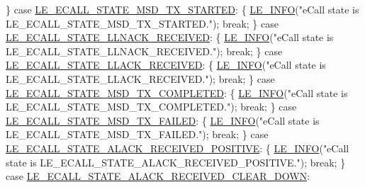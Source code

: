 \begin{DoxyCodeInclude}
{{{{{        \}
        \textcolor{keywordflow}{case} \hyperlink{le__ecall__interface_8h_a233609e4724e549a1405f9177c0a07dda0e8c495854c6fe3f9fe9285554704572}{LE\_ECALL\_STATE\_MSD\_TX\_STARTED}:
        \{
            \hyperlink{le__log_8h_a23e6d206faa64f612045d688cdde5808}{LE\_INFO}(\textcolor{stringliteral}{"eCall state is LE\_ECALL\_STATE\_MSD\_TX\_STARTED."});
            \textcolor{keywordflow}{break};
        \}
        \textcolor{keywordflow}{case} \hyperlink{le__ecall__interface_8h_a233609e4724e549a1405f9177c0a07dda8699c87772e74835e38573fc9830dba5}{LE\_ECALL\_STATE\_LLNACK\_RECEIVED}:
        \{
            \hyperlink{le__log_8h_a23e6d206faa64f612045d688cdde5808}{LE\_INFO}(\textcolor{stringliteral}{"eCall state is LE\_ECALL\_STATE\_LLNACK\_RECEIVED."});
            \textcolor{keywordflow}{break};
        \}
        \textcolor{keywordflow}{case} \hyperlink{le__ecall__interface_8h_a233609e4724e549a1405f9177c0a07dda0410bf309197a2f26910062efb56ed0e}{LE\_ECALL\_STATE\_LLACK\_RECEIVED}:
        \{
            \hyperlink{le__log_8h_a23e6d206faa64f612045d688cdde5808}{LE\_INFO}(\textcolor{stringliteral}{"eCall state is LE\_ECALL\_STATE\_LLACK\_RECEIVED."});
            \textcolor{keywordflow}{break};
        \}
        \textcolor{keywordflow}{case} \hyperlink{le__ecall__interface_8h_a233609e4724e549a1405f9177c0a07ddae9346b115da82c9583f057ba12d8faa9}{LE\_ECALL\_STATE\_MSD\_TX\_COMPLETED}:
        \{
            \hyperlink{le__log_8h_a23e6d206faa64f612045d688cdde5808}{LE\_INFO}(\textcolor{stringliteral}{"eCall state is LE\_ECALL\_STATE\_MSD\_TX\_COMPLETED."});
            \textcolor{keywordflow}{break};
        \}
        \textcolor{keywordflow}{case} \hyperlink{le__ecall__interface_8h_a233609e4724e549a1405f9177c0a07dda3654bda55c075297e9111acafa90a2bb}{LE\_ECALL\_STATE\_MSD\_TX\_FAILED}:
        \{
            \hyperlink{le__log_8h_a23e6d206faa64f612045d688cdde5808}{LE\_INFO}(\textcolor{stringliteral}{"eCall state is LE\_ECALL\_STATE\_MSD\_TX\_FAILED."});
            \textcolor{keywordflow}{break};
        \}
        \textcolor{keywordflow}{case} \hyperlink{le__ecall__interface_8h_a233609e4724e549a1405f9177c0a07dda5a54611736c5cf7131cc196c694d8060}{LE\_ECALL\_STATE\_ALACK\_RECEIVED\_POSITIVE}:
        \{
            \hyperlink{le__log_8h_a23e6d206faa64f612045d688cdde5808}{LE\_INFO}(\textcolor{stringliteral}{"eCall state is LE\_ECALL\_STATE\_ALACK\_RECEIVED\_POSITIVE."});
            \textcolor{keywordflow}{break};
        \}
        \textcolor{keywordflow}{case} \hyperlink{le__ecall__interface_8h_a233609e4724e549a1405f9177c0a07dda2b28ed16149c54b6b3d9c57dea4a748f}{LE\_ECALL\_STATE\_ALACK\_RECEIVED\_CLEAR\_DOWN}:
}}}}}
\end{DoxyCodeInclude}
